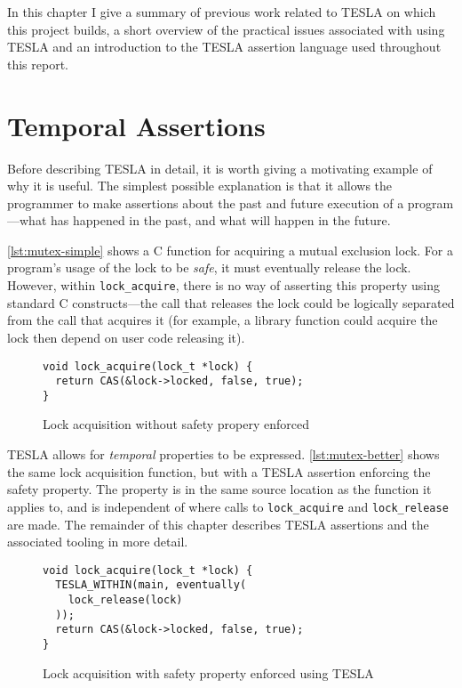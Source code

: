 In this chapter I give a summary of previous work related to TESLA on which this
project builds, a short overview of the practical issues associated with using
TESLA and an introduction to the TESLA assertion language used throughout this
report.

\section{Temporal Assertions}

Before describing TESLA in detail, it is worth giving a motivating example of
why it is useful. The simplest possible explanation is that it allows the
programmer to make assertions about the past and future execution of a
program---what has happened in the past, and what will happen in the future.

\autoref{lst:mutex-simple} shows a C function for acquiring a mutual exclusion
lock. For a program's usage of the lock to be \emph{safe}, it must eventually
release the lock. However, within \texttt{lock_acquire}, there is no way
of asserting this property using standard C constructs---the call that releases
the lock could be logically separated from the call that acquires it (for
example, a library function could acquire the lock then depend on user code
releasing it).

\begin{figure}
  \begin{verbatim}
void lock_acquire(lock_t *lock) {
  return CAS(&lock->locked, false, true);
}
  \end{verbatim}
  \caption{Lock acquisition without safety propery enforced}
  \label{lst:mutex-simple}
\end{figure}

TESLA allows for \emph{temporal} properties to be expressed.
\autoref{lst:mutex-better} shows the same lock acquisition function, but with a
TESLA assertion enforcing the safety property. The property is in the same
source location as the function it applies to, and is independent of where calls
to \texttt{lock_acquire} and \texttt{lock_release} are made. The
remainder of this chapter describes TESLA assertions and the associated tooling
in more detail.

\begin{figure}
  \begin{verbatim}
void lock_acquire(lock_t *lock) {
  TESLA_WITHIN(main, eventually(
    lock_release(lock)
  ));
  return CAS(&lock->locked, false, true);
}
  \end{verbatim}
  \caption{Lock acquisition with safety property enforced using TESLA}
  \label{lst:mutex-better}
\end{figure}

